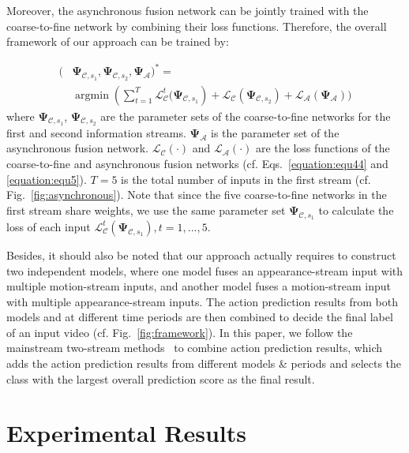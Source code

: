 \documentclass[letterpaper]{article}
\DeclareMathOperator*{\argmin}{argmin}
\begin{document}
Moreover, the asynchronous fusion network can be jointly trained with the coarse-to-fine network by combining their loss functions. Therefore, the overall framework of our approach can be trained by:


\begin{equation}
\begin{aligned}
(&\mathbf{\Psi}_{\mathcal{C},s_1},\mathbf{\Psi}_{\mathcal{C},s_2},\mathbf{\Psi}_{\mathcal{A}})^*= \\ &\mathop{\argmin}{(\sum_{t=1}^T{\mathcal{L}_{\mathcal{C}}^{t}(\mathbf{\Psi}_{\mathcal{C},s_1}})}+  \mathcal{L}_{\mathcal{C}}(\mathbf{\Psi}_{\mathcal{C},s_2})+\mathcal{L}_{\mathcal{A}}(\mathbf{\Psi}_\mathcal{A}))
\end{aligned}
\label{equation:equ6}
\end{equation}
where $\mathbf{\Psi}_{\mathcal{C},s_1}$, $\mathbf{\Psi}_{\mathcal{C},s_2}$ are the parameter sets of the coarse-to-fine networks for the first and second information streams. $\mathbf{\Psi}_{\mathcal{A}}$ is the parameter set of the asynchronous fusion network. $\mathcal{L}_{\mathcal{C}}(\cdot)$ and $\mathcal{L}_{\mathcal{A}}(\cdot)$ are the loss functions of the coarse-to-fine and asynchronous fusion networks (cf. Eqs.~\ref{equation:equ44} and \ref{equation:equ5}). $T=5$ is the total number of inputs in the first stream (cf. Fig.~\ref{fig:asynchronous}). Note that since the five coarse-to-fine networks in the first stream share weights, we use the same parameter set $\mathbf{\Psi}_{\mathcal{C},s_1}$ to calculate the loss of each input $\mathcal{L}_{\mathcal{C}}^{t}(\mathbf{\Psi}_{\mathcal{C},s_1}), t=1,...,5$.

Besides, it should also be noted that our approach actually requires to construct two independent models, where one model fuses an appearance-stream input with multiple motion-stream inputs, and another model fuses a motion-stream input with multiple appearance-stream inputs. The action prediction results from both models and at different time periods are then combined to decide the final label of an input video (cf. Fig.~\ref{fig:framework}). In this paper, we follow the mainstream two-stream methods~\cite{TSN} to combine action prediction results, which adds the action prediction results from different models \& periods and selects the class with the largest overall prediction score as the final result.



\section{Experimental Results\label{section:experimental evaluation}}
\end{document}
